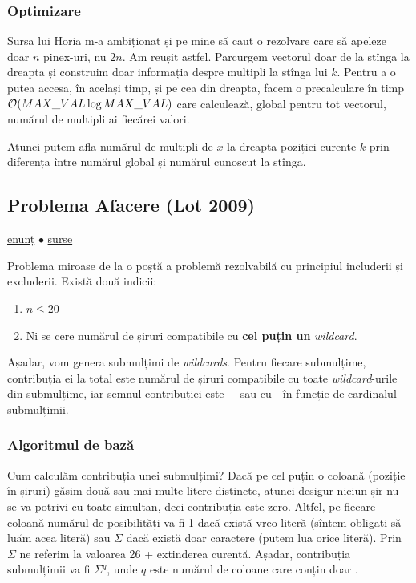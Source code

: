\documentclass[../main.tex]{subfiles}
\begin{document}
\subsubsection*{Optimizare}

Sursa lui Horia m-a ambiționat și pe mine să caut o rezolvare care să apeleze doar $n$ pinex-uri, nu $2n$. Am reușit astfel. Parcurgem vectorul doar de la stînga la dreapta și construim doar informația despre multipli la stînga lui $k$. Pentru a o putea accesa, în același timp, și pe cea din dreapta, facem o precalculare în timp $\mathcal{O}(MAX\_VAL \log MAX\_VAL)$ care calculează, global pentru tot vectorul, numărul de multipli ai fiecărei valori.

Atunci putem afla numărul de multipli de $x$ la dreapta poziției curente $k$ prin diferența între numărul global și numărul cunoscut la stînga.


\subsection{Problema Afacere (Lot 2009)}
\label{problem:afacere}

\href{https://kilonova.ro/problems/2297}{enunț}
$\bullet$
\hyperref[code:afacere]{surse}

Problema miroase de la o poștă a problemă rezolvabilă cu principiul includerii și excluderii. Există două indicii:

\begin{enumerate}
  \item $n \leq 20$
  \item Ni se cere numărul de șiruri compatibile cu \textbf{cel puțin un} \textit{wildcard}.
\end{enumerate}

Așadar, vom genera submulțimi de \textit{wildcards}. Pentru fiecare submulțime, contribuția ei la total este numărul de șiruri compatibile cu toate \textit{wildcard}-urile din submulțime, iar semnul contribuției este + sau cu - în funcție de cardinalul submulțimii.

\subsubsection*{Algoritmul de bază}

Cum calculăm contribuția unei submulțimi? Dacă pe cel puțin o coloană (poziție în șiruri) găsim două sau mai multe litere distincte, atunci desigur niciun șir nu se va potrivi cu toate simultan, deci contribuția este zero. Altfel, pe fiecare coloană numărul de posibilități va fi 1 dacă există vreo literă (sîntem obligați să luăm acea literă) sau $\Sigma$ dacă există doar caractere  (putem lua orice literă). Prin $\Sigma$ ne referim la valoarea 26 + extinderea curentă. Așadar, contribuția submulțimii va fi $\Sigma^q$, unde $q$ este numărul de coloane care conțin doar .
\end{document}

